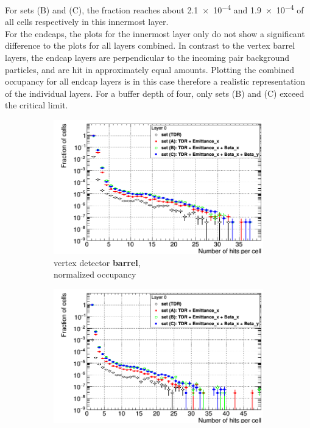 For sets (B) and (C), the fraction reaches about \num{2.1e-4} and \num{1.9e-4} of all cells respectively in this innermost layer.
\\For the endcaps, the plots for the innermost layer only do not show a significant difference to the plots for all layers combined.
In contrast to the vertex barrel layers, the endcap layers are perpendicular to the incoming pair background particles, and are hit in approximately equal amounts.
Plotting the combined occupancy for all endcap layers is in this case therefore a realistic representation of the individual layers.
For a buffer depth of four, only sets (B) and (C) exceed the critical limit.
  \begin{figure}
  \captionsetup[subfigure]{justification=centering}
 \centering
  \begin{subfigure}[b]{0.49\textwidth}
   \centering
    \includegraphics[width=\textwidth]{Figures/Pairs/Occupancy_Comparison_Layer_0_numcells_ILC250_ALL_SETS_SiVertexBarrel_corrected_Barrel_size.png}
   \caption{\sid vertex detector \textbf{barrel},\\normalized occupancy}
   \end{subfigure}
   \hfill
     \begin{subfigure}[b]{0.49\textwidth}
   \centering
    \includegraphics[width=\textwidth]{Figures/Pairs/Occupancy_Comparison_Layer_0_numcells_ILC250_ALL_SETS_5T_w_antiDiD_SiVertexEndcap.png}

\end{subfigure}
\end{figure}
